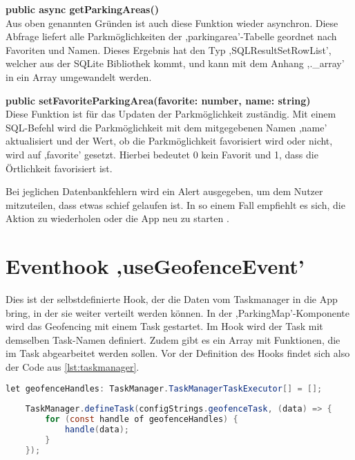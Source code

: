\begin{description}
	\item \textbf{public async getParkingAreas()} \\ Aus oben genannten Gründen ist auch diese Funktion wieder asynchron. Diese Abfrage liefert alle Parkmöglichkeiten der ,parkingarea'-Tabelle geordnet nach Favoriten und Namen. Dieses Ergebnis hat den Typ ,SQLResultSetRowList', welcher aus der SQLite Bibliothek kommt, und kann mit dem Anhang ,.\_array' in ein Array umgewandelt werden.
	\item \textbf{public setFavoriteParkingArea(favorite: number, name: string)} \\ Diese Funktion ist für das Updaten der Parkmöglichkeit zuständig. Mit einem SQL-Befehl wird die Parkmöglichkeit mit dem mitgegebenen Namen ,name' aktualisiert und der Wert, ob die Parkmöglichkeit favorisiert wird oder nicht, wird auf ,favorite' gesetzt. Hierbei bedeutet 0 kein Favorit und 1, dass die Örtlichkeit favorisiert ist.
\end{description}

Bei jeglichen Datenbankfehlern wird ein Alert ausgegeben, um dem Nutzer mitzuteilen, dass etwas schief gelaufen ist. In so einem Fall empfiehlt es sich, die Aktion zu wiederholen oder die App neu zu starten \cite{sqlite}.

\section{Eventhook ,useGeofenceEvent'}
\label{geofenceEvent}
Dies ist der selbstdefinierte Hook, der die Daten vom Taskmanager in die App bring, in der sie weiter verteilt werden können. In der ,ParkingMap'-Komponente wird das Geofencing mit einem Task gestartet. Im Hook wird der Task mit demselben Task-Namen definiert. Zudem gibt es ein Array mit Funktionen, die im Task abgearbeitet werden sollen. Vor der Definition des Hooks findet sich also der Code aus \autoref{lst:taskmanager}.

\begin{lstlisting}[caption={Dieser Code befindet sich vor der Definition des Eventhooks. Hier wird ein Array angelegt, welches Funktionen beinhaltet. Diese werden dann ab Zeile 11 im definierten Task abgearbeitet. (Quelle: Eigene Implementierung)},captionpos=b, language=Java, label=lst:taskmanager]
	let geofenceHandles: TaskManager.TaskManagerTaskExecutor[] = [];
	
	TaskManager.defineTask(configStrings.geofenceTask, (data) => {
		for (const handle of geofenceHandles) {
			handle(data);
		}
	});
\end{lstlisting}

